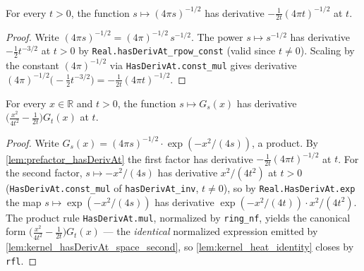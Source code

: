 \begin{lemma}
    \label{lem:prefactor_hasDerivAt}
    \leanok
    For every $t > 0$, the function $s \mapsto (4\pi s)^{-1/2}$ has derivative
    $-\tfrac{1}{2t}(4\pi t)^{-1/2}$ at $t$.
\end{lemma}
\begin{proof}
    Write $(4\pi s)^{-1/2} = (4\pi)^{-1/2}\, s^{-1/2}$. The power $s \mapsto s^{-1/2}$
    has derivative $-\tfrac12 t^{-3/2}$ at $t > 0$ by
    \texttt{Real.hasDerivAt\_rpow\_const} (valid since $t \neq 0$). Scaling by the
    constant $(4\pi)^{-1/2}$ via \texttt{HasDerivAt.const\_mul} gives derivative
    $(4\pi)^{-1/2}\bigl(-\tfrac12 t^{-3/2}\bigr) = -\tfrac{1}{2t}(4\pi t)^{-1/2}$.
\end{proof}

\begin{lemma}
    \label{lem:kernel_hasDerivAt_time}
    \leanok
    For every $x \in \mathbb{R}$ and $t > 0$, the function $s \mapsto G_s(x)$ has
    derivative $\bigl(\tfrac{x^2}{4t^2} - \tfrac{1}{2t}\bigr) G_t(x)$ at $t$.
\end{lemma}
\begin{proof}
    Write $G_s(x) = (4\pi s)^{-1/2}\cdot \exp(-x^2/(4s))$, a product. By
    \cref{lem:prefactor_hasDerivAt} the first factor has derivative
    $-\tfrac{1}{2t}(4\pi t)^{-1/2}$ at $t$. For the second factor, $s \mapsto -x^2/(4s)$
    has derivative $x^2/(4t^2)$ at $t > 0$ (\texttt{HasDerivAt.const\_mul} of
    \texttt{hasDerivAt\_inv}, $t \neq 0$), so by \texttt{Real.HasDerivAt.exp} the map
    $s \mapsto \exp(-x^2/(4s))$ has derivative $\exp(-x^2/(4t))\cdot x^2/(4t^2)$.
    The product rule \texttt{HasDerivAt.mul}, normalized by \texttt{ring\_nf}, yields
    the canonical form $\bigl(\tfrac{x^2}{4t^2} - \tfrac{1}{2t}\bigr)G_t(x)$ — the
    \emph{identical} normalized expression emitted by
    \cref{lem:kernel_hasDerivAt_space_second}, so \cref{lem:kernel_heat_identity}
    closes by \texttt{rfl}.
\end{proof}

